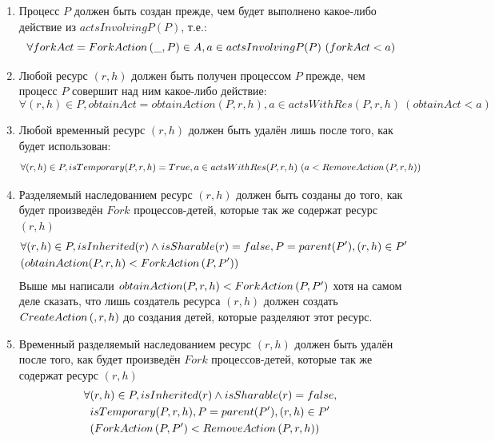 \begin{enumerate}
	\item \label{chap2:preced:a} Процесс $P$ должен быть создан прежде, чем будет выполнено какое-либо действие из $actsInvolvingP(P)$, т.е.:
		\begin{equation*}
		     \forall forkAct = ForkAction\left( \_, P \right) \in A, a \in actsInvolvingP(P)\ (forkAct < a) 
		\end{equation*}

	\item \label{chap2:preced:b} Любой ресурс $(r, h)$ должен быть получен процессом $P$ прежде, чем процесс $P$ совершит над ним какое-либо действие:
		\begin{equation*}
			\forall (r, h) \in P, obtainAct = obtainAction(P, r, h), a \in actsWithRes(P, r, h)\ (obtainAct < a)
		\end{equation*}

	\item \label{chap2:preced:c} Любой временный ресурс $(r, h)$ должен быть удалён лишь после того, как будет использован:
		\begin{equation*}
			\forall (r, h) \in P, isTemporary(P, r, h) = True, a \in actsWithRes(P, r, h)\ (a < RemoveAction\left( P, r, h \right))
		\end{equation*}

	\item \label{chap2:preced:d} Разделяемый наследованием ресурс $(r, h)$ должен быть созданы до того, как будет произведён $Fork$ процессов-детей, которые так же содержат ресурс $(r, h)$
		\begin{align*}
			&\forall (r, h) \in P, isInherited(r) \land isSharable(r) = false, P = parent(P'), (r, h) \in P'\\
			&(obtainAction(P, r, h) < ForkAction\left( P, P' \right))
		\end{align*}
		Выше мы написали $obtainAction(P, r, h) < ForkAction\left( P, P' \right)$ хотя на самом деле сказать, что лишь создатель ресурса $(r, h)$ должен создать $CreateAction\left( , r, h \right)$ до создания детей, которые разделяют этот ресурс. 

	\item \label{chap2:preced:e} Временный разделяемый наследованием ресурс $(r, h)$ должен быть удалён после того, как будет произведён $Fork$ процессов-детей, которые так же содержат ресурс $(r, h)$
		\begin{align*}
			\forall & (r, h) \in P, isInherited(r) \land isSharable(r) = false, \\
			&isTemporary(P, r, h), P = parent(P'), (r, h) \in P'\\
			&(ForkAction\left( P, P' \right) < RemoveAction\left( P, r, h \right))
		\end{align*}


\end{enumerate}
